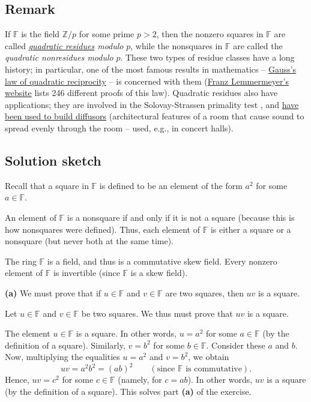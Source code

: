 \documentclass[paper=a4, fontsize=12pt]{scrartcl}%
\theoremstyle{plainsl}
\theoremstyle{definition}
\theoremstyle{remark}
\begin{document}
\subsection{Remark}

If $\mathbb{F}$ is the field $\mathbb{Z}/p$ for some prime $p>2$, then the
nonzero squares in $\mathbb{F}$ are called
\textit{\href{https://en.wikipedia.org/wiki/Quadratic_residue}{\textit{quadratic
residues}} modulo }$p$, while the nonsquares in $\mathbb{F}$ are called the
\textit{quadratic nonresidues modulo }$p$. These two types of residue classes
have a long history; in particular, one of the most famous results in
mathematics --
\href{https://en.wikipedia.org/wiki/Quadratic_reciprocity}{Gauss's law of
quadratic reciprocity} -- is concerned with them
(\href{http://www.rzuser.uni-heidelberg.de/~hb3/fchrono.html}{Franz
Lemmermeyer's website} lists 246 different proofs of this law). Quadratic
residues also have applications; they are involved in the Solovay-Strassen
primality test \cite[Chapter 6]{Gallier-RSA}, and
\href{https://en.wikipedia.org/wiki/Diffusion_(acoustics)#Quadratic-residue_diffusors}{have
been used to build diffusors} (architectural features of a room that cause
sound to spread evenly through the room -- used, e.g., in concert halls).

\subsection{Solution sketch}

Recall that a square in $\mathbb{F}$ is defined to be an element of the form
$a^{2}$ for some $a\in\mathbb{F}$.

An element of $\mathbb{F}$ is a nonsquare if and only if it is not a square
(because this is how nonsquares were defined). Thus, each element of
$\mathbb{F}$ is either a square or a nonsquare (but never both at the same time).

The ring $\mathbb{F}$ is a field, and thus is a commutative skew field. Every
nonzero element of $\mathbb{F}$ is invertible (since $\mathbb{F}$ is a skew field).

\bigskip

\textbf{(a)} We must prove that if $u\in\mathbb{F}$ and $v\in\mathbb{F}$ are
two squares, then $uv$ is a square.

Let $u\in\mathbb{F}$ and $v\in\mathbb{F}$ be two squares. We thus must prove
that $uv$ is a square.

The element $u\in\mathbb{F}$ is a square. In other words, $u=a^{2}$ for some
$a\in\mathbb{F}$ (by the definition of a square). Similarly, $v=b^{2}$ for
some $b\in\mathbb{F}$. Consider these $a$ and $b$. Now, multiplying the
equalities $u=a^{2}$ and $v=b^{2}$, we obtain
\[
uv=a^{2}b^{2}=\left(  ab\right)  ^{2}\qquad\left(  \text{since }%
\mathbb{F}\text{ is commutative}\right)  .
\]
Hence, $uv=c^{2}$ for some $c\in\mathbb{F}$ (namely, for $c=ab$). In other
words, $uv$ is a square (by the definition of a square). This solves part
\textbf{(a)} of the exercise.
\end{document}
